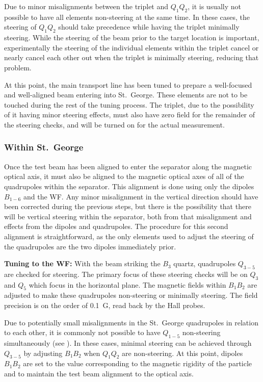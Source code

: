 Due to minor misalignments between the triplet and $Q_1Q_2$, it is
usually not possible to have all elements non-steering at the same time.
In these cases, the steering of $Q_1Q_2$ should take precedence while
having the triplet minimally steering. While the steering of the beam
prior to the target location is important, experimentally the steering
of the individual elements within the triplet cancel or nearly cancel
each other out when the triplet is minimally steering, reducing that
problem.

At this point, the main transport line has been tuned to prepare a
well-focused and well-aligned beam entering into St.\ George. These
elements are not to be touched during the rest of the tuning process.
The triplet, due to the possibility of it having minor steering effects,
must also have zero field for the remainder of the steering checks, and
will be turned on for the actual measurement.

\subsubsection{Within St.\ George}
\label{sec:tuning_stg}

Once the test beam has been aligned to enter the separator along the
magnetic optical axis, it must also be aligned to the magnetic optical
axes of all of the quadrupoles within the separator. This alignment is
done using only the dipoles $B_{1-6}$ and the WF. Any minor misalignment
in the vertical direction should have been corrected during the previous
steps, but there is the possibility that there will be vertical steering
within the separator, both from that misalignment and effects from the
dipoles and quadrupoles. The procedure for this second alignment is
straightforward, as the only elements used to adjust the steering of the
quadrupoles are the two dipoles immediately prior.

\textbf{Tuning to the WF:}
With the beam striking the $B_3$ quartz, quadrupoles $Q_{3-5}$ are
checked for steering. The primary focus of these steering checks will be
on $Q_3$ and $Q_5$ which focus in the horizontal plane. The magnetic
fields within $B_1B_2$ are adjusted to make these quadrupoles
non-steering or minimally steering. The field precision is on the order
of 0.1~G, read back by the Hall probes.

Due to potentially small misalignments in the St.\ George quadrupoles in
relation to each other, it is commonly not possible to have $Q_{1-5}$
non-steering simultaneously (see \cite{Meisel2017}). In these cases,
minimal steering can be achieved through $Q_{3-5}$ by adjusting $B_1B_2$
when $Q_1Q_2$ are non-steering. At this point, dipoles $B_1B_2$ are set
to the value corresponding to the magnetic rigidity of the particle and
to maintain the test beam alignment to the optical axis.

